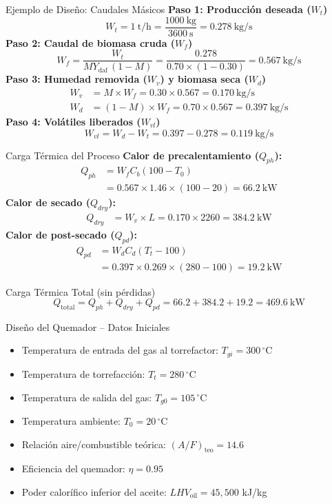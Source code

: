 \documentclass[main.tex]{subfiles}
\begin{document}
\begin{frame}{Ejemplo de Diseño: Caudales Másicos}
\small
\textbf{Paso 1: Producción deseada ($W_t$)}
\[
W_t = \SI{1}{\tonne\per\hour} = \frac{\SI{1000}{\kilogram}}{\SI{3600}{\second}} = \SI{0.278}{\kilogram\per\second}
\]
\textbf{Paso 2: Caudal de biomasa cruda ($W_f$)}
\[
W_f=\frac{W_t}
     {MY_{\text{daf}}\,(1-M)}
   =\frac{\num{0.278}}{\num{0.70} \times (1-\num{0.30})}
   = \SI{0.567}{\kilogram\per\second}
\]
\textbf{Paso 3: Humedad removida ($W_v$) y biomasa seca ($W_d$)}
\begin{align*}
W_v &= M \times W_f = \num{0.30} \times \num{0.567} = \SI{0.170}{\kilogram\per\second} \\
W_d &= (1-M) \times W_f = \num{0.70} \times \num{0.567} = \SI{0.397}{\kilogram\per\second}
\end{align*}
\textbf{Paso 4: Volátiles liberados ($W_{vl}$)}
\[
W_{vl} = W_d - W_t = \num{0.397} - \num{0.278} = \SI{0.119}{\kilogram\per\second}
\]
\end{frame}

\begin{frame}{Carga Térmica del Proceso}
\small
\textbf{Calor de precalentamiento ($Q_{ph}$):}
\begin{align*}
Q_{ph} &= W_f C_{b} (100-T_0) \\
       &= \num{0.567} \times \num{1.46} \times (100-20) = \SI{66.2}{\kilo\watt}
\end{align*}
\textbf{Calor de secado ($Q_{dry}$):}
\begin{align*}
Q_{dry} &= W_v \times L = \num{0.170} \times \num{2260} = \SI{384.2}{\kilo\watt}
\end{align*}
\textbf{Calor de post-secado ($Q_{pd}$):}
\begin{align*}
Q_{pd} &= W_d C_{d} (T_t - 100) \\
       &= \num{0.397} \times \num{0.269} \times (280-100) = \SI{19.2}{\kilo\watt}
\end{align*}
\begin{alertblock}{Carga Térmica Total (sin pérdidas)}
\[
Q_{\text{total}} = Q_{ph} + Q_{dry} + Q_{pd} = 66.2 + 384.2 + 19.2 = \SI{469.6}{\kilo\watt}
\]
\end{alertblock}
\end{frame}


\begin{frame}{Diseño del Quemador – Datos Iniciales}
\begin{itemize}
  \item Temperatura de entrada del gas al torrefactor: $T_{gi} = 300\,^\circ$C
  \item Temperatura de torrefacción: $T_t = 280\,^\circ$C
  \item Temperatura de salida del gas: $T_{g0} = 105\,^\circ$C
  \item Temperatura ambiente: $T_0 = 20\,^\circ$C
  \item Relación aire/combustible teórica: $(A/F)_{\text{teo}} = 14.6$
  \item Eficiencia del quemador: $\eta = 0.95$
  \item Poder calorífico inferior del aceite: $LHV_{\text{oil}} = 45{,}500$ kJ/kg
\end{itemize}
\end{frame}
\end{document}
